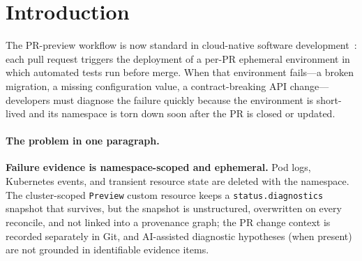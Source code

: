 \documentclass[sigconf, nonacm=true, anonymous=false, review=false]{acmart}
\begin{document}
\begin{abstract}
The diagnostic results are deliberately mixed rather than uniformly
positive. Pooled across all five applications (treated as equal,
exchangeable subjects), the typed evidence bundle multiplies the odds of
a correct diagnosis by ${\sim}12\times$ over logs-only (primary
mixed-effects logistic model, $p<10^{-26}$), but absolute aligned top-1
stays modest: $19.7\,\%$ for the LLM-grounded diagnoser and $15.8\,\%$
for the rule-grounded diagnoser, versus a ${\le}5\,\%$ floor for raw
logs or raw \texttt{kubectl} text. Our regime-symmetric post-teardown
comparators (K8sGPT-PT and Kagent-PT, consuming the same operator
evidence) reach $14.8\,\%$ and $10.8\,\%$. A vanilla LLM over an
operator-curated kubectl-equivalent bundle can even outperform the
proposed diagnoser on parts of the subject set, showing that the
artifact alone does not solve RCA. The evidence therefore supports a narrower claim: operator-captured
provenance makes post-teardown failure analysis persistent, auditable, and
reproducible, while accurate automatic RCA still requires stronger
diagnostic models and fair post-teardown comparators. We release the
operator, harness, analysis scripts, and bibliography as a reproducible
artifact.
\end{abstract}


\maketitle

\section{Introduction}
\label{sec:intro}

The PR-preview workflow is now standard in cloud-native software
development~\cite{signadot_preview_envs, okteto_preview_envs,
jenkinsx_preview_envs, argocd_cncf}: each pull request triggers the
deployment of a per-PR ephemeral environment in which automated tests
run before merge. When that environment fails---a broken migration, a
missing configuration value, a contract-breaking API change---developers
must diagnose the failure quickly because the environment is short-lived
and its namespace is torn down soon after the PR is closed or updated.

\paragraph{The problem in one paragraph.}
\textbf{Failure evidence is namespace-scoped and ephemeral.} Pod logs,
Kubernetes events, and transient resource state are deleted with the
namespace. The cluster-scoped \texttt{Preview} custom resource keeps a
\texttt{status.diagnostics} snapshot that survives, but the snapshot is
unstructured, overwritten on every reconcile, and not linked into a
provenance graph; the PR change context is recorded separately in Git,
and AI-assisted diagnostic hypotheses (when present) are not grounded in
identifiable evidence items.
\end{document}
